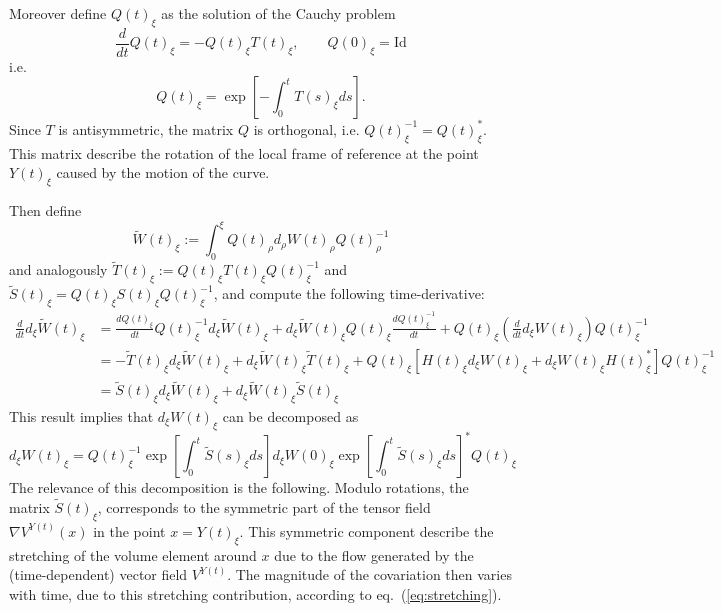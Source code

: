 \documentclass[a4paper,12pt,reqno]{amsart}
\begin{document}
Moreover define $Q(t)_\xi$ as the solution of the Cauchy problem
$$
\frac{d}{dt} Q(t)_\xi = - Q(t)_\xi T(t)_\xi, \qquad Q(0)_\xi = \text{Id}
$$
i.e. 
$$
Q(t)_\xi = \exp\left[-\int_0^t T(s)_\xi ds \right].
$$
Since $T$ is antisymmetric, the matrix $Q$ is orthogonal,
i.e. $Q(t)_\xi^{-1} = Q(t)_\xi^*$. This matrix describe the
rotation of the local frame of reference at the point $Y(t)_\xi$
caused by the motion of the curve. 

Then define 
$$
\widetilde W(t)_{\xi} := \int_0^\xi Q(t)_\rho d_\rho W(t)_\rho Q(t)_\rho^{-1}
$$ 
and analogously $\widetilde
T(t)_\xi := Q(t)_\xi T(t)_\xi Q(t)_\xi^{-1}$ and $\widetilde S(t)_\xi
=  Q(t)_\xi S(t)_\xi Q(t)_\xi^{-1}$, and compute the following time-derivative:
\begin{equation*}
  \begin{split}
 \frac{d}{dt} d_\xi \widetilde W(t)_\xi & = \frac{dQ(t)_\xi}{dt} Q(t)_\xi^{-1}
 d_\xi \widetilde W(t)_\xi + d_\xi \widetilde W(t)_\xi Q(t)_\xi \frac{dQ(t)_\xi^{-1}}{dt} +
 Q(t)_\xi \left(\frac{d}{dt} d_\xi W(t)_\xi \right) Q(t)_\xi^{-1}  
\\ & = - \widetilde T(t)_\xi 
 d_\xi\widetilde W(t)_\xi + d_\xi\widetilde W(t)_\xi \widetilde T(t)_\xi+
 Q(t)_\xi [H(t)_\xi d_\xi W(t)_\xi +  d_\xi W(t)_\xi H(t)_\xi^* ] Q(t)_\xi^{-1}   
\\ & = \widetilde S(t)_\xi d_\xi \widetilde W(t)_\xi +
 d_\xi \widetilde W(t)_\xi \widetilde S(t)_\xi
  \end{split}
\end{equation*}
This result implies that $d_\xi W(t)_\xi$ can be decomposed as
\begin{equation}
  \label{eq:stretching}
d_\xi W(t)_\xi = Q(t)_\xi^{-1} \exp\left[\int_0^t \widetilde S(s)_\xi ds\right]
d_\xi W(0)_\xi
\exp\left[\int_0^t \widetilde S(s)_\xi ds\right]^* Q(t)_\xi  
\end{equation}
The relevance of this decomposition is the following. Modulo
rotations, the matrix $\widetilde S(t)_\xi$, corresponds to the
symmetric part of the tensor field $\nabla V^{Y(t)}(x)$ in the point
$x = Y(t)_\xi$. This symmetric component describe the stretching of
the  volume element around $x$ due to the flow generated by
the (time-dependent)  vector
field $V^{Y(t)}$. The magnitude of the covariation then varies
with time, due to this
 stretching contribution, according to eq.~(\ref{eq:stretching}).
   
\end{document}

